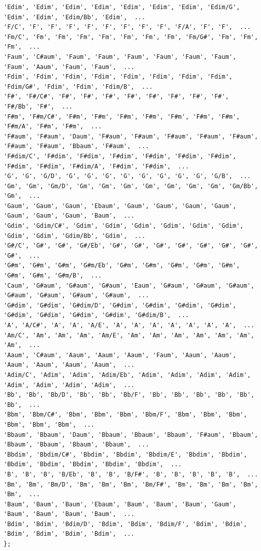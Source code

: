 \begin{itemize}
\begin{lstlisting}
'Edim', 'Edim', 'Edim', 'Edim', 'Edim', 'Edim', 'Edim', 'Edim/G', 'Edim', 'Edim', 'Edim/Bb', 'Edim',  ... 
'F/C', 'F', 'F', 'F', 'F', 'F', 'F', 'F', 'F', 'F/A', 'F', 'F',  ... 
'Fm/C', 'Fm', 'Fm', 'Fm', 'Fm', 'Fm', 'Fm', 'Fm', 'Fm/G#', 'Fm', 'Fm', 'Fm',  ... 
'Faum', 'C#aum', 'Faum', 'Faum', 'Faum', 'Faum', 'Faum', 'Faum', 'Faum', 'Aaum', 'Faum', 'Faum',  ... 
'Fdim', 'Fdim', 'Fdim', 'Fdim', 'Fdim', 'Fdim', 'Fdim', 'Fdim', 'Fdim/G#', 'Fdim', 'Fdim', 'Fdim/B',  ... 
'F#', 'F#/C#', 'F#', 'F#', 'F#', 'F#', 'F#', 'F#', 'F#', 'F#', 'F#/Bb', 'F#',  ... 
'F#m', 'F#m/C#', 'F#m', 'F#m', 'F#m', 'F#m', 'F#m', 'F#m', 'F#m', 'F#m/A', 'F#m', 'F#m',  ... 
'F#aum', 'F#aum', 'Daum', 'F#aum', 'F#aum', 'F#aum', 'F#aum', 'F#aum', 'F#aum', 'F#aum', 'Bbaum', 'F#aum',  ... 
'F#dim/C', 'F#dim', 'F#dim', 'F#dim', 'F#dim', 'F#dim', 'F#dim', 'F#dim', 'F#dim', 'F#dim/A', 'F#dim', 'F#dim',  ... 
'G', 'G', 'G/D', 'G', 'G', 'G', 'G', 'G', 'G', 'G', 'G', 'G/B',  ... 
'Gm', 'Gm', 'Gm/D', 'Gm', 'Gm', 'Gm', 'Gm', 'Gm', 'Gm', 'Gm', 'Gm/Bb', 'Gm',  ... 
'Gaum', 'Gaum', 'Gaum', 'Ebaum', 'Gaum', 'Gaum', 'Gaum', 'Gaum', 'Gaum', 'Gaum', 'Gaum', 'Baum',  ... 
'Gdim', 'Gdim/C#', 'Gdim', 'Gdim', 'Gdim', 'Gdim', 'Gdim', 'Gdim', 'Gdim', 'Gdim', 'Gdim/Bb', 'Gdim',  ... 
'G#/C', 'G#', 'G#', 'G#/Eb', 'G#', 'G#', 'G#', 'G#', 'G#', 'G#', 'G#', 'G#',  ... 
'G#m', 'G#m', 'G#m', 'G#m/Eb', 'G#m', 'G#m', 'G#m', 'G#m', 'G#m', 'G#m', 'G#m', 'G#m/B',  ... 
'Caum', 'G#aum', 'G#aum', 'G#aum', 'Eaum', 'G#aum', 'G#aum', 'G#aum', 'G#aum', 'G#aum', 'G#aum', 'G#aum',  ... 
'G#dim', 'G#dim', 'G#dim/D', 'G#dim', 'G#dim', 'G#dim', 'G#dim', 'G#dim', 'G#dim', 'G#dim', 'G#dim', 'G#dim/B',  ... 
'A', 'A/C#', 'A', 'A', 'A/E', 'A', 'A', 'A', 'A', 'A', 'A', 'A',  ... 
'Am/C', 'Am', 'Am', 'Am', 'Am/E', 'Am', 'Am', 'Am', 'Am', 'Am', 'Am', 'Am',  ... 
'Aaum', 'C#aum', 'Aaum', 'Aaum', 'Aaum', 'Faum', 'Aaum', 'Aaum', 'Aaum', 'Aaum', 'Aaum', 'Aaum',  ... 
'Adim/C', 'Adim', 'Adim', 'Adim/Eb', 'Adim', 'Adim', 'Adim', 'Adim', 'Adim', 'Adim', 'Adim', 'Adim',  ... 
'Bb', 'Bb', 'Bb/D', 'Bb', 'Bb', 'Bb/F', 'Bb', 'Bb', 'Bb', 'Bb', 'Bb', 'Bb',  ... 
'Bbm', 'Bbm/C#', 'Bbm', 'Bbm', 'Bbm', 'Bbm/F', 'Bbm', 'Bbm', 'Bbm', 'Bbm', 'Bbm', 'Bbm',  ... 
'Bbaum', 'Bbaum', 'Daum', 'Bbaum', 'Bbaum', 'Bbaum', 'F#aum', 'Bbaum', 'Bbaum', 'Bbaum', 'Bbaum', 'Bbaum',  ... 
'Bbdim', 'Bbdim/C#', 'Bbdim', 'Bbdim', 'Bbdim/E', 'Bbdim', 'Bbdim', 'Bbdim', 'Bbdim', 'Bbdim', 'Bbdim', 'Bbdim',  ... 
'B', 'B', 'B', 'B/Eb', 'B', 'B', 'B/F#', 'B', 'B', 'B', 'B', 'B',  ... 
'Bm', 'Bm', 'Bm/D', 'Bm', 'Bm', 'Bm', 'Bm/F#', 'Bm', 'Bm', 'Bm', 'Bm', 'Bm',  ... 
'Baum', 'Baum', 'Baum', 'Ebaum', 'Baum', 'Baum', 'Baum', 'Gaum', 'Baum', 'Baum', 'Baum', 'Baum',  ... 
'Bdim', 'Bdim', 'Bdim/D', 'Bdim', 'Bdim', 'Bdim/F', 'Bdim', 'Bdim', 'Bdim', 'Bdim', 'Bdim', 'Bdim',  ... 
};



\end{lstlisting}
\end{itemize}
